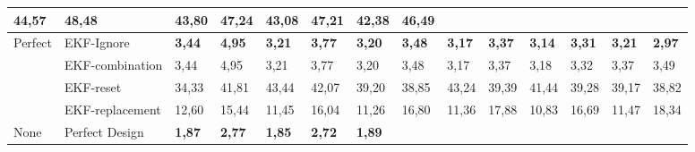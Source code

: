 \documentclass[letterpaper, 10 pt, conference]{ieeeconf}  %
\begin{document}
\begin{table*}[]
\begin{tabular}{@{}llllllllllllll@{}}
	\multicolumn{1}{l|}{44,57} &
	\multicolumn{1}{l|}{48,48} &
	\multicolumn{1}{l|}{43,80} &
	\multicolumn{1}{l|}{47,24} &
	\multicolumn{1}{l|}{43,08} &
	\multicolumn{1}{l|}{47,21} &
	\multicolumn{1}{l|}{42,38} &
	\multicolumn{1}{l|}{46,49} \\ \midrule
	\multicolumn{1}{|l|}{\multirow{4}{*}{Perfect}} &
	\multicolumn{1}{l|}{EKF-Ignore} &
	\multicolumn{1}{l|}{\textbf{3,44}} &
	\multicolumn{1}{l|}{\textbf{4,95}} &
	\multicolumn{1}{l|}{\textbf{3,21}} &
	\multicolumn{1}{l|}{\textbf{3,77}} &
	\multicolumn{1}{l|}{\textbf{3,20}} &
	\multicolumn{1}{l|}{\textbf{3,48}} &
	\multicolumn{1}{l|}{\textbf{3,17}} &
	\multicolumn{1}{l|}{\textbf{3,37}} &
	\multicolumn{1}{l|}{\textbf{3,14}} &
	\multicolumn{1}{l|}{\textbf{3,31}} &
	\multicolumn{1}{l|}{\textbf{3,21}} &
	\multicolumn{1}{l|}{\textbf{2,97}} \\ \cmidrule(l){2-14} 
	\multicolumn{1}{|l|}{} &
	\multicolumn{1}{l|}{EKF-combination} &
	\multicolumn{1}{l|}{3,44} &
	\multicolumn{1}{l|}{4,95} &
	\multicolumn{1}{l|}{3,21} &
	\multicolumn{1}{l|}{3,77} &
	\multicolumn{1}{l|}{3,20} &
	\multicolumn{1}{l|}{3,48} &
	\multicolumn{1}{l|}{3,17} &
	\multicolumn{1}{l|}{3,37} &
	\multicolumn{1}{l|}{3,18} &
	\multicolumn{1}{l|}{3,32} &
	\multicolumn{1}{l|}{3,37} &
	\multicolumn{1}{l|}{3,49} \\ \cmidrule(l){2-14} 
	\multicolumn{1}{|l|}{} &
	\multicolumn{1}{l|}{EKF-reset} &
	\multicolumn{1}{l|}{34,33} &
	\multicolumn{1}{l|}{41,81} &
	\multicolumn{1}{l|}{43,44} &
	\multicolumn{1}{l|}{42,07} &
	\multicolumn{1}{l|}{39,20} &
	\multicolumn{1}{l|}{38,85} &
	\multicolumn{1}{l|}{43,24} &
	\multicolumn{1}{l|}{39,39} &
	\multicolumn{1}{l|}{41,44} &
	\multicolumn{1}{l|}{39,28} &
	\multicolumn{1}{l|}{39,17} &
	\multicolumn{1}{l|}{38,82} \\ \cmidrule(l){2-14} 
	\multicolumn{1}{|l|}{} &
	\multicolumn{1}{l|}{EKF-replacement} &
	\multicolumn{1}{l|}{12,60} &
	\multicolumn{1}{l|}{15,44} &
	\multicolumn{1}{l|}{11,45} &
	\multicolumn{1}{l|}{16,04} &
	\multicolumn{1}{l|}{11,26} &
	\multicolumn{1}{l|}{16,80} &
	\multicolumn{1}{l|}{11,36} &
	\multicolumn{1}{l|}{17,88} &
	\multicolumn{1}{l|}{10,83} &
	\multicolumn{1}{l|}{16,69} &
	\multicolumn{1}{l|}{11,47} &
	\multicolumn{1}{l|}{18,34} \\ \midrule
	\multicolumn{1}{|l|}{\multirow{2}{*}{None}} &
	\multicolumn{1}{l|}{Perfect Design} &
	\multicolumn{1}{l|}{\textbf{1,87}} &
	\multicolumn{1}{l|}{\textbf{2,77}} &
	\multicolumn{1}{l|}{\textbf{1,85}} &
	\multicolumn{1}{l|}{\textbf{2,72}} &
	\multicolumn{1}{l|}{\textbf{1,89}} &

\end{tabular}
\end{table*}
\end{document}
